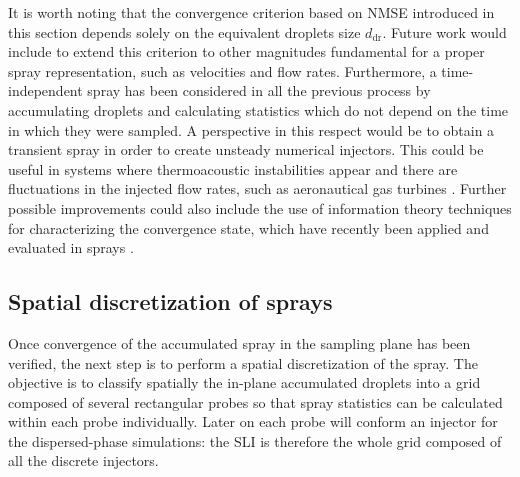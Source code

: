 It is worth noting that the convergence criterion based on NMSE introduced in this section depends solely on the equivalent droplets size $d_\mathrm{dr}$. Future work would include to extend this criterion to other magnitudes fundamental for a proper spray representation, such as velocities and flow rates. Furthermore, a time-independent spray has been considered in all the previous process by accumulating droplets and calculating statistics which do not depend on the time in which they were sampled. A perspective in this respect would be to obtain a transient spray in order to create unsteady numerical injectors. This could be useful in systems where thermoacoustic instabilities appear and there are fluctuations in the injected flow rates, such as aeronautical gas turbines . Further possible improvements could also include the use of information theory techniques for characterizing the convergence state, which have recently been applied and evaluated in sprays .


%
%
%

\subsection{Spatial discretization of sprays}
\label{subsec:SLI_spatial_discretization}

Once convergence of the accumulated spray in the sampling plane has been verified, the next step is to perform a spatial discretization of the spray. The objective is to classify spatially the in-plane accumulated droplets into a grid composed of several rectangular probes so that spray statistics can be calculated within each probe individually. Later on each probe will conform an injector for the dispersed-phase simulations: the SLI is therefore the whole grid composed of all the discrete injectors.

